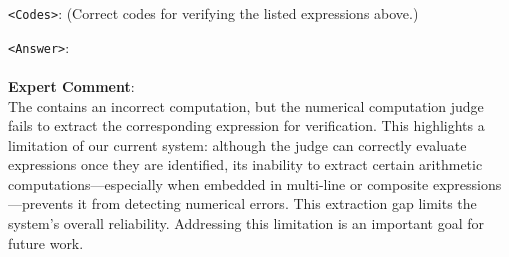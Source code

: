 \begin{examplebox}
\texttt{<Codes>}: (Correct codes for verifying the listed expressions above.)

\texttt{<Answer>}: 
\\\\
\textbf{Expert Comment}: \\
The  contains an incorrect computation, but the numerical computation judge fails to extract the corresponding expression for verification. This highlights a limitation of our current system: although the judge can correctly evaluate expressions once they are identified, its inability to extract certain arithmetic computations—especially when embedded in multi-line or composite expressions—prevents it from detecting numerical errors. This extraction gap limits the system’s overall reliability. Addressing this limitation is an important goal for future work.
\end{examplebox}


